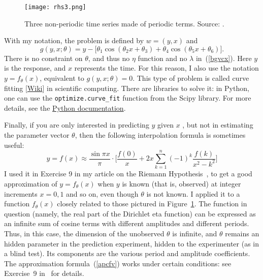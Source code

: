 \documentclass[oneside,10pt]{book}
\begin{document}
\begin{figure}[H]
\centering
\texttt{[image: rhs3.png]}  
\caption{Three non-periodic time series made of periodic terms. Source: \cite{vggrh2022}.}
\label{fig:rhs3v2}
\end{figure}


With my notation, the problem is 
 defined by $w=(y,x)$ and
 \begin{equation}
g(y,x;\theta)= y - \Big[\theta_1 \cos(\theta_2 x + \theta_3) + \theta_4\cos (\theta_5 x + \theta_6)\Big]. \label{rtfer}
\end{equation}
There is no constraint on $\theta$, and thus no $\eta$ function and no $\lambda$ in~(\ref{bgvcx}). Here $y$ is the response, and $x$ represents the time. For this reason, I also use the notation $y=f_\theta(x)$, equivalent to $g(y,x;\theta)=0$. This type of problem is called \textcolor{index}{curve fitting} 
 [\href{https://en.wikipedia.org/wiki/Curve_fitting}{Wiki}] in scientific computing. There are libraries to solve it: in Python,
 one can use the \texttt{optimize.curve\_fit} function from the Scipy library. For more details, see the
 \href{https://docs.scipy.org/doc/scipy/reference/generated/scipy.optimize.curve_fit.html}{Python documentation}. 



Finally, if you are only interested in predicting $y$ given $x$ , but not in estimating the parameter vector $\theta$, then the following interpolation formula 
is sometimes useful:
\begin{equation}
y=f(x)\approx \frac{\sin\pi x}{\pi}\cdot \Bigg[ \frac{f(0)}{x} + 2x\sum_{k=1}^n (-1)^k \frac{f(k)}{x^2-k^2}\Bigg] \label{apcfv}
\end{equation}
I used it in Exercise 9 in my article on the Riemann Hypothesis~\cite{vggrh2022}, to get a good approximation of $y=f_\theta(x)$ when $y$ is known (that is, observed) at
integer increments $x=0,1$ and so on, even though $\theta$ is not known. I applied it to a function $f_\theta(x)$ closely related
to those pictured in Figure~\ref{fig:rhs3v2}. The function in question (namely, the real part of the Dirichlet eta function) can be expressed as an infinite sum of cosine terms with different amplitudes and different periods.
 Thus, in this case, the dimension of the unobserved $\theta$ is infinite, and $\theta$ remains an hidden parameter in the prediction experiment, hidden to the experimenter (as in a blind test). Its components are the various period and amplitude coefficients. 
 The approximation formula~(\ref{apcfv}) works under certain conditions: see Exercise~9 in~\cite{vggrh2022} for details. 
\end{document}
